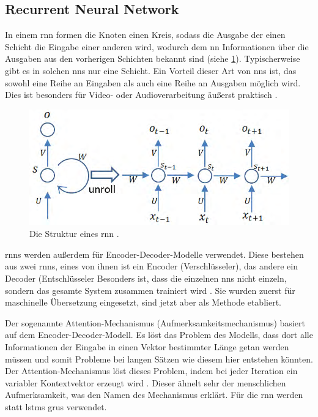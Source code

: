 \subsection{Recurrent Neural Network}\label{sub:rnn}
In einem \ac{rnn} formen die Knoten einen Kreis, sodass die Ausgabe der einen Schicht die Eingabe einer anderen wird,
wodurch dem \ac{nn} Informationen über die Ausgaben aus den vorherigen Schichten bekannt sind (siehe \cref{fig:struktur-rnn}).
Typischerweise gibt es in solchen \acp{nn} nur eine Schicht.
Ein Vorteil dieser Art von \acp{nn} ist, das sowohl eine Reihe an Eingaben als auch eine Reihe an Ausgaben möglich wird.
Dies ist besonders für Video- oder Audioverarbeitung äußerst praktisch \citep{deeplearningarchitecturesreview}.
\begin{figure}%
\centering
\includegraphics[width=\textwidth, height=\textheight, keepaspectratio]{Images/RNN.png}
\caption[Struktur von RNNs]{Die Struktur eines \ac{rnn} \citep{deeplearningarchitecturesreview}.}
\label{fig:struktur-rnn}
\end{figure}

\acp{rnn} werden außerdem für Encoder-Decoder-Modelle \citep{seq2seqB} verwendet.
Diese bestehen aus zwei \acp{rnn}, eines von ihnen ist ein Encoder (Verschlüsseler), das andere ein Decoder (Entschlüsseler
Besonders ist, dass die einzelnen \acp{nn} nicht einzeln, sondern das gesamte System zusammen trainiert wird \citep{seq2seqA}.
Sie wurden zuerst für maschinelle Übersetzung eingesetzt, sind jetzt aber als Methode etabliert.

Der sogenannte Attention-Mechanismus (Aufmerksamkeitsmechanismus) basiert auf dem Encoder-Decoder-Modell.
Es löst das Problem des Modells, dass dort alle Informationen der Eingabe in einen Vektor bestimmter Länge getan werden müssen
und somit Probleme bei langen Sätzen wie diesem hier entstehen könnten.
Der Attention-Mechanismus löst dieses Problem, indem bei jeder Iteration ein variabler Kontextvektor erzeugt wird \citep{attentionintro}.
Dieser ähnelt sehr der menschlichen Aufmerksamkeit, was den Namen des Mechanismus erklärt.
Für die \ac{rnn} werden statt \acsp{lstm} \acsp{gru} verwendet.

